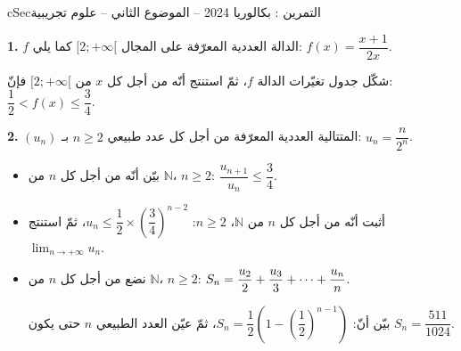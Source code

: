 \documentclass[12pt,a4paper]{article}
\newenvironment{BOX}[2]{\begin{otherlanguage}{english}\begin{arbox}{#1}{#2}}{\end{arbox}\end{otherlanguage}}
\newcounter{exo}
\newenvironment{tamrin}[1]{\stepcounter{exo}\begin{BOX}{cSec}{التمرين \theexo: #1}}{\end{BOX}}
\renewcommand{\cdots}{\mathinner{\cdotp\cdotp\cdotp}}
\newcommand{\N}{\mathbb{N}}
\newcommand{\limn}{\displaystyle\lim_{n\to+\infty}}
\newenvironment{sq}{\begin{itemize}[leftmargin=2.4em,itemsep=3pt]}{\end{itemize}}
\newcommand{\qa}{\item[(أ)]}\newcommand{\qb}{\item[(ب)]}\newcommand{\qc}{\item[(جـ)]}\newcommand{\qd}{\item[(د)]}\newcommand{\qe}{\item[(هـ)]}
\newcommand{\QQ}[1]{\par\smallskip\textbf{#1.} }
\begin{document}
\begin{tamrin}{بكالوريا 2024 -- الموضوع الثاني -- علوم تجريبية}
\QQ{1} $f$ الدالة العددية المعرّفة على المجال $[2;+\infty[$ كما يلي: $f(x)=\dfrac{x+1}{2x}$.

شكّل جدول تغيّرات الدالة $f$، ثمّ استنتج أنّه من أجل كل $x$ من $[2;+\infty[$ فإنّ: $\dfrac12<f(x)\leqslant\dfrac34$.

\QQ{2} $(u_n)$ المتتالية العددية المعرّفة من أجل كل عدد طبيعي $n\geqslant 2$ بـ: $u_n=\dfrac{n}{2^n}$.
\begin{sq}
\qa بيّن أنّه من أجل كل $n$ من $\N$، $n\geqslant 2$: $\dfrac{u_{n+1}}{u_n}\leqslant\dfrac34$.
\qb أثبت أنّه من أجل كل $n$ من $\N$، $n\geqslant 2$: $u_n\leqslant\dfrac12\times\left(\dfrac34\right)^{n-2}$، ثمّ استنتج $\limn u_n$.
\qc نضع من أجل كل $n$ من $\N$، $n\geqslant 2$: $S_n=\dfrac{u_2}{2}+\dfrac{u_3}{3}+\cdots+\dfrac{u_n}{n}$.

بيّن أنّ: $S_n=\dfrac12\left(1-\left(\dfrac12\right)^{n-1}\right)$، ثمّ عيّن العدد الطبيعي $n$ حتى يكون $S_n=\dfrac{511}{1024}$.
\end{sq}
\end{tamrin}
\end{document}
